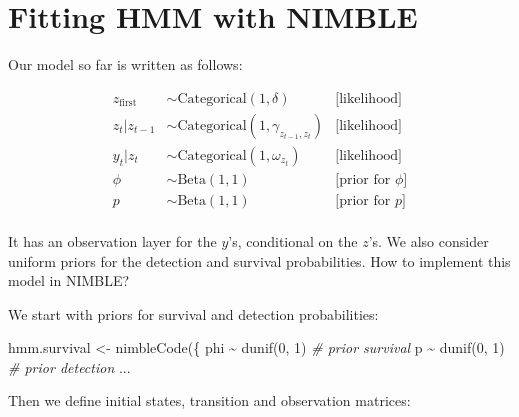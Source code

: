 \documentclass[
  12pt,
]{krantz}
\newenvironment{Shaded}{\begin{snugshade}}{\end{snugshade}}
\newcommand{\CommentTok}[1]{\textcolor[rgb]{0.56,0.35,0.01}{\textit{#1}}}
\newcommand{\DecValTok}[1]{\textcolor[rgb]{0.00,0.00,0.81}{#1}}
\newcommand{\FunctionTok}[1]{\textcolor[rgb]{0.00,0.00,0.00}{#1}}
\newcommand{\NormalTok}[1]{#1}
\newcommand{\OtherTok}[1]{\textcolor[rgb]{0.56,0.35,0.01}{#1}}
\newcommand{\SpecialCharTok}[1]{\textcolor[rgb]{0.00,0.00,0.00}{#1}}
\begin{document}
\hypertarget{fitting-hmm-with-nimble}{%
\section{Fitting HMM with NIMBLE}\label{fitting-hmm-with-nimble}}

Our model so far is written as follows:

\begin{align*}
   z_{\text{first}} &\sim \text{Categorical}(1, \delta) &\text{[likelihood]}\\
   z_t | z_{t-1} &\sim \text{Categorical}(1, \gamma_{z_{t-1},z_{t}}) &\text{[likelihood]}\\
   y_t | z_{t} &\sim \text{Categorical}(1, \omega_{z_{t}}) &\text{[likelihood]}\\
  \phi &\sim \text{Beta}(1, 1) &\text{[prior for }\phi \text{]} \\
  p &\sim \text{Beta}(1, 1) &\text{[prior for }p \text{]} \\
\end{align*}

It has an observation layer for the \(y\)'s, conditional on the \(z\)'s. We also consider uniform priors for the detection and survival probabilities. How to implement this model in NIMBLE?

We start with priors for survival and detection probabilities:

\begin{Shaded}
\begin{Highlighting}[]
\NormalTok{hmm.survival }\OtherTok{\textless{}{-}} \FunctionTok{nimbleCode}\NormalTok{(\{}
\NormalTok{  phi }\SpecialCharTok{\textasciitilde{}} \FunctionTok{dunif}\NormalTok{(}\DecValTok{0}\NormalTok{, }\DecValTok{1}\NormalTok{) }\CommentTok{\# prior survival}
\NormalTok{  p }\SpecialCharTok{\textasciitilde{}} \FunctionTok{dunif}\NormalTok{(}\DecValTok{0}\NormalTok{, }\DecValTok{1}\NormalTok{) }\CommentTok{\# prior detection}
\NormalTok{...}
\end{Highlighting}
\end{Shaded}

Then we define initial states, transition and observation matrices:
\end{document}
